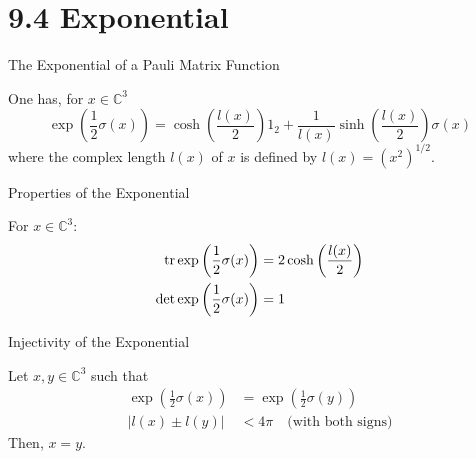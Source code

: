 \section{9.4 Exponential}

\begin{frame}{The Exponential of a Pauli Matrix Function}
    \begin{proposition}[9.4.1]
        One has, for $x \in \mathbb{C}^3$
        \[ \exp\left(\frac{1}{2}\sigma(x)\right) = \cosh\left(\frac{l(x)}{2}\right)1_2 + \frac{1}{l(x)}\sinh\left(\frac{l(x)}{2}\right)\sigma(x) \]
        where the complex length $l(x)$ of $x$ is defined by $l(x) = (x^2)^{1/2}$.
    \end{proposition}
\end{frame}

\begin{frame}{Properties of the Exponential}
    \begin{proposition}[9.4.2 \& 9.4.3]
        For $x \in \mathbb{C}^3$:
        \begin{align*}
            \tr \exp\left(\frac{1}{2}\sigma(x)\right)  & = 2\cosh\left(\frac{l(x)}{2}\right) \\
            \det \exp\left(\frac{1}{2}\sigma(x)\right) & = 1
        \end{align*}
    \end{proposition}
\end{frame}

\begin{frame}{Injectivity of the Exponential}
    \begin{proposition}[9.4.4]
        Let $x, y \in \mathbb{C}^3$ such that
        \begin{align*}
            \exp\left(\frac{1}{2}\sigma(x)\right) & = \exp\left(\frac{1}{2}\sigma(y)\right) \\
            |l(x) \pm l(y)|                       & < 4\pi \quad \text{(with both signs)}
        \end{align*}
        Then, $x = y$.
    \end{proposition}
\end{frame}